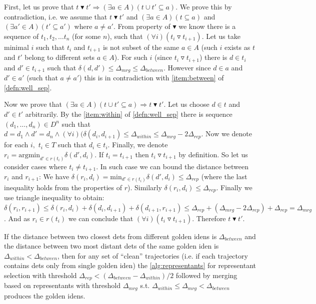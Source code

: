 \begin{myproof}
First, let us prove that $t \blacktriangledown t' \Rightarrow (\exists a \in A) (t \cup t' \subseteq a)$. We prove this by contradiction, i.e. we assume
that $t \blacktriangledown t'$ and $(\exists a \in A) (t \subseteq a)$ and $(\exists a' \in A) (t' \subseteq a')$ where $a \neq a'$. From property of $\blacktriangledown$ we know there is a sequence of $t_1, t_2, \ldots t_n$ (for some $n$), such that $(\forall i) (t_i \triangledown t_{i+1})$. Let
us take minimal $i$ such that $t_i$ and $t_{i+1}$ is not subset of the same
$a \in A$ (such $i$ exists as $t$ and $t'$ belong to different sets $a \in A$).
For such $i$ (since $t_i \triangledown t_{i+1}$) there is $d \in t_i$ and
$d' \in t_{i+1}$ such that $\delta(d, d') \leq \Delta_{mrg} \leq \Delta_{between}$. However since $d \in a$
and $d' \in a'$ (such that $a \neq a'$) this is in contradiction with \ref{item:between} of \autoref{defn:well_sep}.

Now we prove that $(\exists a \in A) (t \cup t' \subseteq a) \Rightarrow t \blacktriangledown t'$. Let us choose $d \in t$ and $d' \in t'$ arbitrarily. By the
\ref{item:within} of \autoref{defn:well_sep} there is sequence $(d_1, \ldots, d_n) \in D^n$
such that $d = d_1 \land d' = d_n \land (\forall i) (\delta(d_i, d_{i+1}) \leq \Delta_{within} \leq \Delta_{mrg} - 2\Delta_{rep}$. Now we denote for each $i,$ $t_i \in T$ such that
$d_i \in t_i$. Finally, we denote $r_i = \mathrm{argmin}_{d' \in r(t_i)} \delta(d', d_i)$. If $t_i = t_{i+1}$ then $t_i \triangledown t_{i+1}$ by definition.
So let us consider cases where $t_i \neq t_{i+1}$. In such case we can bound
the distance between $r_i$ and $r_{i+1}$: We have $\delta(r_i, d_i) = \mathrm{min}_{d' \in r(t_i)} \delta(d', d_i) \leq \Delta_{rep}$ (where the last inequality holds from the properties of $r$). Similarly  $\delta(r_i, d_i) \leq \Delta_{rep}$. Finally we use triangle inequality to obtain: $\delta(r_i, r_{i+1}) \leq \delta(r_i, d_i) + \delta(d_i, d_{i+1}) + \delta(d_{i+1}, r_{i+1}) \leq \Delta_{rep} + (\Delta_{mrg} - 2\Delta_{rep}) + \Delta_{rep} = \Delta_{mrg}$. And as $r_i \in r(t_i)$ we can conclude that $(\forall i) (t_i \triangledown t_{i+1})$. Therefore $t \blacktriangledown t'$.\end{myproof}


\begin{cor}
If the distance between two closest \glspl{det} from different golden
\glspl{iden} is $\Delta_{between}$ and the distance between two most distant \glspl{det}
of the same golden \gls{iden} is $\Delta_{within} < \Delta_{between}$, then for any set of ``clean''
trajectories (i.e. if each trajectory contains \glspl{det} only from single
golden \gls{iden}) the \autoref{alg:representants} for representant selection
with threshold $\Delta_{rep} < (\Delta_{between} - \Delta_{within}) / 2$ followed by merging based on representants with
threshold $\Delta_{mrg}$ s.t. $\Delta_{within} \leq \Delta_{mrg} < \Delta_{between}$ produces the golden \glspl{iden}.
\end{cor}

